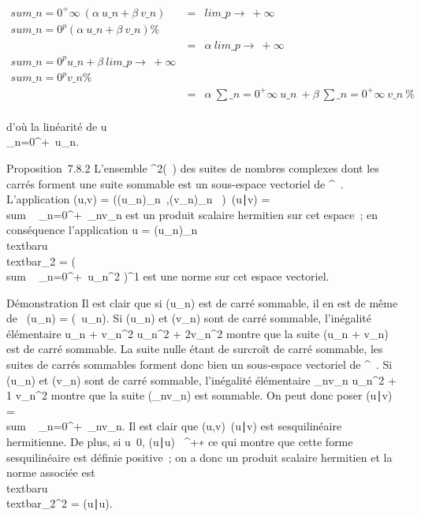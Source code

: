 \documentclass[]{article}
\begin{document}
\begin{align*} \\sum
\_n=0^+\infty~(\alpha~u\_ n + \beta~v\_n)& =&
lim\_p\rightarrow~+\infty~~\\sum
\_n=0^p(\alpha~u\_ n + \beta~v\_n) \%&
\\ & =&
\alpha~lim\_p\rightarrow~+\infty~~\\sum
\_n=0^pu\_ n +
\beta~lim\_p\rightarrow~+\infty~\\sum
\_n=0^pv\_ n\%& \\
& =& \alpha~\sum \_n=0^+\infty~u\_ n~
+ \beta~\sum \_n=0^+\infty~v\_ n~ \%&
\\ \end{align*}

d'où la linéarité de
u\mapsto~\\\sum
 \_n=0^+\infty~u\_n.

Proposition~7.8.2 L'ensemble \ell^2(~) des suites de nombres
complexes dont les carrés forment une suite sommable est un sous-espace
vectoriel de ^~. L'application (u,v) = \left
((u\_n)\_n\in{}~,(v\_n)\_n\in{}~\right
)\mapsto~(u\mathrel∣v)
= \\sum ~
\_n=0^+\infty~\overlineu\_nv\_n
est un produit scalaire hermitien sur cet espace~; en conséquence
l'application u =
(u\_n)\_n\in{}~\mapsto~\\textbar{}u\\textbar{}\_2
= \left
(\\sum ~
\_n=0^+\infty~\textbar{}u\_n\textbar{}^2\right
)^1 est une norme sur cet espace vectoriel.

Démonstration Il est clair que si (u\_n) est de carré sommable,
il en est de même de \alpha~(u\_n) = (\alpha~u\_n). Si
(u\_n) et (v\_n) sont de carré sommable, l'inégalité
élémentaire \textbar{}u\_n + v\_n\textbar{}^2
\textbar{}u\_n\textbar{}^2 +
2\textbar{}v\_n\textbar{}^2 montre que la suite
(u\_n + v\_n) est de carré sommable. La suite nulle
étant de surcroît de carré sommable, les suites de carrés sommables
forment donc bien un sous-espace vectoriel de ^~. Si
(u\_n) et (v\_n) sont de carré sommable, l'inégalité
élémentaire
\textbar{}\overlineu\_nv\_n\textbar{}  \textbar{}u\_n\textbar{}^2
+ 1 
\textbar{}v\_n\textbar{}^2 montre que la suite
(\overlineu\_nv\_n) est sommable. On
peut donc poser (u∣v)
= \\sum ~
\_n=0^+\infty~\overlineu\_nv\_n.
Il est clair que
(u,v)\mapsto~(u\mathrel∣v) est
sesquilinéaire hermitienne. De plus, si u\neq~0,
(u∣u) \in {}~^+∗ ce qui montre que
cette forme sesquilinéaire est définie positive~; on a donc un produit
scalaire hermitien et la norme associée est
\\textbar{}u\\textbar{}\_2^2
= (u∣u).
\end{document}
